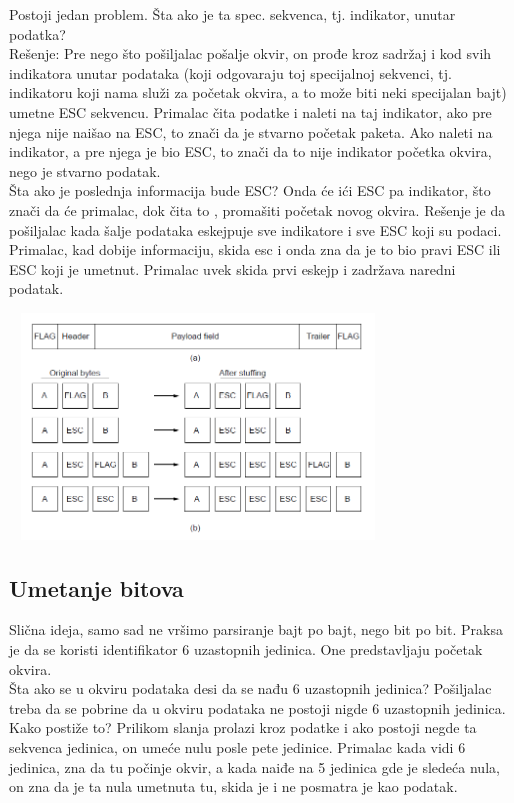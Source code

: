 \documentclass{article} %
\begin{document}
Postoji jedan problem. Šta ako je ta spec. sekvenca, tj. indikator, unutar podatka?\\
Rešenje: Pre nego što pošiljalac pošalje okvir, on prođe kroz sadržaj i kod svih indikatora unutar podataka (koji odgovaraju toj specijalnoj sekvenci, tj. indikatoru koji nama služi za početak okvira, a to može biti neki specijalan bajt) umetne ESC sekvencu. Primalac čita podatke i naleti na taj indikator, ako pre njega nije naišao na ESC, to znači da je stvarno početak paketa. Ako naleti na indikator, a pre njega je bio ESC, to znači da to nije indikator početka okvira, nego je stvarno podatak. \\

Šta ako je poslednja informacija bude ESC? Onda će ići ESC pa indikator, što znači da će primalac, dok čita to , promašiti početak novog okvira. Rešenje je da pošiljalac kada šalje podataka eskejpuje sve indikatore i sve ESC koji su podaci. Primalac, kad dobije informaciju, skida esc i onda zna da je to bio pravi ESC ili ESC koji je umetnut. Primalac uvek skida prvi eskejp i zadržava naredni podatak. 
\begin{center}
\includegraphics[width=10cm, height=6cm]{umetanjeBajtova}\\
\end{center}
\subsection{Umetanje bitova}
Slična ideja, samo sad ne vršimo parsiranje bajt po bajt, nego bit po bit. Praksa je da se koristi identifikator 6 uzastopnih jedinica. One predstavljaju početak okvira.\\

Šta ako se u okviru podataka desi da se nađu 6 uzastopnih jedinica? Pošiljalac treba da se pobrine da u okviru podataka ne postoji nigde 6 uzastopnih jedinica. Kako postiže to? Prilikom slanja prolazi kroz podatke i ako postoji negde ta sekvenca jedinica, on umeće nulu posle pete jedinice. Primalac kada vidi 6 jedinica, zna da tu počinje okvir, a kada naiđe na 5 jedinica gde je sledeća nula, on zna da je ta nula umetnuta tu, skida je i ne posmatra je kao podatak.\\
\end{document}
